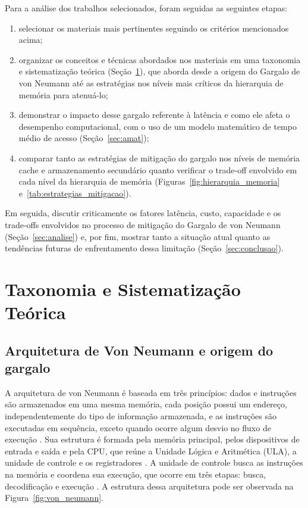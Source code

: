 \documentclass[portuguese]{sbcreviews-2025}%
\begin{document}
Para a análise dos trabalhos selecionados, foram seguidas as seguintes etapas:
\begin{enumerate}
    \item selecionar os materiais mais pertinentes seguindo os critérios mencionados acima;
    \item organizar os conceitos e técnicas abordados nos materiais em uma taxonomia e sistematização teórica (Seção~\ref{sec:taxonomia}), que aborda desde a origem do Gargalo de von Neumann até as 
    estratégias nos níveis mais críticos da hierarquia de memória para atenuá-lo;
    \item demonstrar o impacto desse gargalo referente à latência e como ele afeta o desempenho computacional, com o uso de um modelo matemático de tempo médio de acesso (Seção~\ref{sec:amat});
    \item comparar tanto as estratégias de mitigação do gargalo nos níveis de memória cache e armazenamento secundário quanto verificar o trade-off envolvido em cada nível da hierarquia de memória 
    (Figuras~\ref{fig:hierarquia_memoria} e~\ref{tab:estrategias_mitigacao}).
\end{enumerate}

Em seguida, discutir criticamente os fatores latência, custo, capacidade e os trade-offs envolvidos no processo de mitigação do Gargalo de von Neumann (Seção~\ref{sec:analise}) e, por fim, mostrar tanto a 
situação atual quanto as tendências futuras de enfrentamento dessa limitação (Seção~\ref{sec:conclusao}).

\section{Taxonomia e Sistematização Teórica}
\label{sec:taxonomia}

\subsection{Arquitetura de Von Neumann e origem do gargalo}
\label{sec:von_neumann}

A arquitetura de von Neumann é baseada em três princípios: dados e instruções são armazenados em uma mesma memória, cada posição possui um endereço, independentemente do tipo de informação armazenada, e as 
instruções são executadas em sequência, exceto quando ocorre algum desvio no fluxo de execução \citep{stallings2010}. Sua estrutura é formada pela memória principal, pelos dispositivos de entrada e saída e pela CPU, 
que reúne a Unidade Lógica e Aritmética (ULA), a unidade de controle e os registradores \citep{couto2017, tanenbaum2013}. A unidade de controle busca as instruções na memória e coordena sua execução, que ocorre em três etapas: 
busca, decodificação e execução \citep{couto2017}. A estrutura dessa arquitetura pode ser observada na Figura~\ref{fig:von_neumann}.
\end{document}
